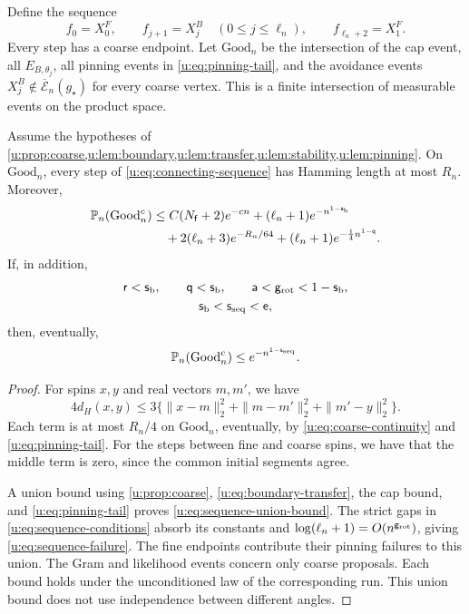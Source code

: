 Define the sequence
\begin{equation}\label{u:eq:connecting-sequence}
 f_0=X_0^F,\qquad f_{j+1}=X_j^B\quad(0\le j\le\ell_n),
 \qquad f_{\ell_n+2}=X_1^F.
\end{equation}
Every step has a coarse endpoint. Let $\mathrm{Good}_n$ be the intersection
of the cap event, all $E_{B,\theta_j}$, all pinning events in
\eqref{u:eq:pinning-tail}, and the avoidance events
$X_j^B\notin\overline{\mathcal E}_n(g_\star)$ for every coarse vertex.
This is a finite intersection of measurable events on the product space.

\begin{proposition}\label{u:prop:sequence}
Assume the hypotheses of
\cref{u:prop:coarse,u:lem:boundary,u:lem:transfer,u:lem:stability,u:lem:pinning}.
On $\mathrm{Good}_n$, every step of \eqref{u:eq:connecting-sequence} has
Hamming length at most $R_n$. Moreover,
\begin{equation}\label{u:eq:sequence-union-bound}
 \begin{split}
 \mathbb P_n(\mathrm{Good}_n^c)
 &\le C(N_{\mathsf{f}}+2)e^{-cn}
       +(\ell_n+1)e^{-n^{1-\mathsf{s}_{\rm b}}}\\
 &\quad+2(\ell_n+3)e^{-R_n/64}
       +(\ell_n+1)e^{-\frac14 n^{1-\mathsf{q}}}.
 \end{split}
\end{equation}
If, in addition,
\begin{equation}\label{u:eq:sequence-conditions}
 \begin{gathered}
 \mathsf{r}<\mathsf{s}_{\rm b},\qquad \mathsf{q}<\mathsf{s}_{\rm b},\qquad
 \mathsf{a}<\mathsf{g}_{\rm rot}<1-\mathsf{s}_{\rm b},\\
 \mathsf{s}_{\rm b}<\mathsf{s}_{\rm seq}<\mathsf{e},
 \end{gathered}
\end{equation}
then, eventually,
\begin{equation}\label{u:eq:sequence-failure}
 \mathbb P_n(\mathrm{Good}_n^c)\le e^{-n^{1-\mathsf{s}_{\rm seq}}}.
\end{equation}
\end{proposition}

\begin{proof}
For spins $x,y$ and real vectors $m,m'$, we have
\[
 4d_H(x,y)\le3\{\|x-m\|_2^2+\|m-m'\|_2^2+\|m'-y\|_2^2\}.
\]
Each term is at most $R_n/4$ on $\mathrm{Good}_n$, eventually, by
\eqref{u:eq:coarse-continuity} and \eqref{u:eq:pinning-tail}. For the steps between fine and coarse spins, we have that the middle
term is zero, since the common initial segments agree.

A union bound using \cref{u:prop:coarse},
\eqref{u:eq:boundary-transfer}, the cap bound, and
\eqref{u:eq:pinning-tail} proves \eqref{u:eq:sequence-union-bound}.
The strict gaps in \eqref{u:eq:sequence-conditions} absorb its constants
and $\log(\ell_n+1)=O(n^{\mathsf{g}_{\rm rot}})$, giving
\eqref{u:eq:sequence-failure}. The fine endpoints contribute their pinning
failures to this union. The Gram and likelihood events concern only coarse proposals. Each
bound holds under the unconditioned law of the corresponding run. This union bound does not use independence between different angles.
\end{proof}

